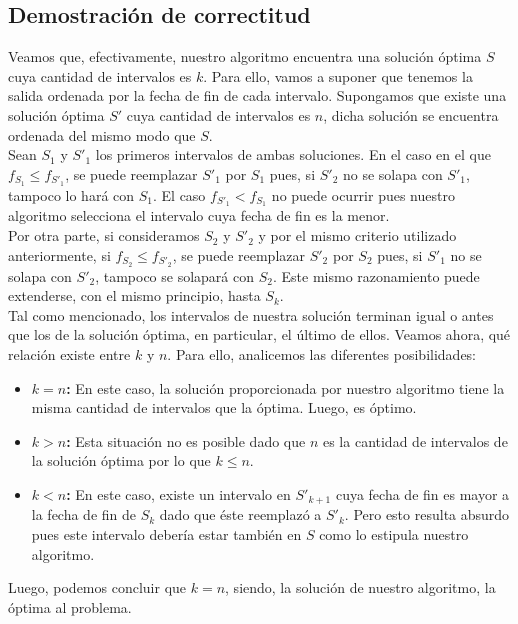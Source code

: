 \subsection{Demostración de correctitud}

Veamos que, efectivamente, nuestro algoritmo encuentra una solución óptima $S$ cuya cantidad de intervalos es $k$. Para ello, vamos a suponer que tenemos la salida ordenada por la fecha de fin de cada intervalo. Supongamos que existe una solución óptima $S'$ cuya cantidad de intervalos es $n$, dicha solución se encuentra ordenada del mismo modo que $S$.\\ Sean $S_{1}$ y $S'_{1}$ los primeros intervalos de ambas soluciones. En el caso en el que $f_{S_{1}} \leq f_{S'_{1}}$, se puede reemplazar $S'_{1}$ por $S_{1}$ pues, si $S'_{2}$ no se solapa con $S'_{1}$, tampoco lo hará con $S_{1}$. El caso $f_{S'_{1}} < f_{S_{1}}$ no puede ocurrir pues nuestro algoritmo selecciona el intervalo cuya fecha de fin es la menor.\\
Por otra parte, si consideramos $S_{2}$ y $S'_{2}$ y por el mismo criterio utilizado anteriormente, si $f_{S_{2}} \leq f_{S'_{2}}$, se puede reemplazar $S'_{2}$ por $S_{2}$ pues, si $S'_{1}$ no se solapa con $S'_{2}$, tampoco se solapará con $S_{2}$. Este mismo razonamiento puede extenderse, con el mismo principio, hasta $S_{k}$.\\
Tal como mencionado, los intervalos de nuestra solución terminan igual o antes que los de la solución óptima, en particular, el último de ellos. Veamos ahora, qué relación existe entre $k$ y $n$. Para ello, analicemos las diferentes posibilidades:
\begin{itemize}
\item \textbf{$k = n$:} En este caso, la solución proporcionada por nuestro algoritmo tiene la misma cantidad de intervalos que la óptima. Luego, es óptimo.
\item \textbf{$k > n$:} Esta situación no es posible dado que $n$ es la cantidad de intervalos de la solución óptima por lo que $k \leq n$.
\item \textbf{$k < n$:} En este caso, existe un intervalo en $S'_{k+1}$ cuya fecha de fin es mayor a la fecha de fin de $S_{k}$ dado que éste reemplazó a $S'_{k}$. Pero esto resulta absurdo pues este intervalo debería estar también en $S$ como lo estipula nuestro algoritmo.
\end{itemize}

Luego, podemos concluir que $k = n$, siendo, la solución de nuestro algoritmo, la óptima al problema. 

